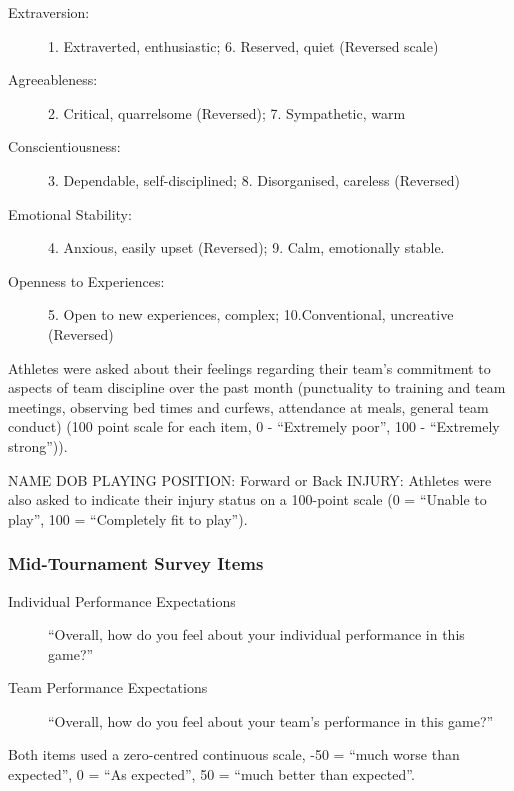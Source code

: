 \begin{description}
\item [Extraversion:] 1. Extraverted, enthusiastic; 6. Reserved, quiet (Reversed scale)
\item [Agreeableness:] 2. Critical, quarrelsome (Reversed); 7. Sympathetic, warm
\item [Conscientiousness:] 3. Dependable, self-disciplined; 8. Disorganised, careless (Reversed)
\item [Emotional Stability:] 4. Anxious, easily upset (Reversed); 9. Calm, emotionally stable.
\item [Openness to Experiences:] 5. Open to new experiences, complex; 10.Conventional, uncreative (Reversed)
\end{description}



Athletes were asked about their feelings regarding their team's commitment to aspects of team discipline over the past month (punctuality to training and team meetings, observing bed times and curfews, attendance at meals, general team conduct) (100 point scale for each item, 0 - ``Extremely poor'', 100 - ``Extremely strong'')).

NAME
DOB
PLAYING POSITION: Forward or Back
INJURY:  Athletes were also asked to indicate their injury status on a 100-point scale (0 = ``Unable to play'', 100 = ``Completely fit to play'').



\subsubsection{\label{app5:surveyMid}Mid-Tournament Survey Items}

\begin{description}
\item [Individual Performance Expectations]``Overall, how do you feel about your individual performance in this game?''
\item [Team Performance Expectations] ``Overall, how do you feel about your team's performance in this game?''
\end{description}
Both items used a zero-centred continuous scale, -50 = ``much worse than expected'', 0 =  ``As expected'', 50 =  ``much better than expected''.

